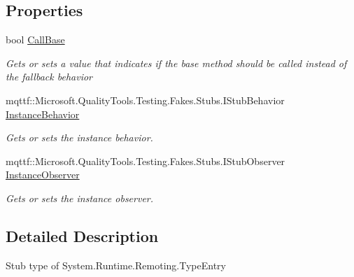 \subsection*{Properties}
\begin{DoxyCompactItemize}
\item 
bool \hyperlink{class_system_1_1_runtime_1_1_remoting_1_1_fakes_1_1_stub_type_entry_a349a3e9e214a63f0b3a0bbc73bd42094}{Call\-Base}
\begin{DoxyCompactList}\small\item\em Gets or sets a value that indicates if the base method should be called instead of the fallback behavior\end{DoxyCompactList}\item 
mqttf\-::\-Microsoft.\-Quality\-Tools.\-Testing.\-Fakes.\-Stubs.\-I\-Stub\-Behavior \hyperlink{class_system_1_1_runtime_1_1_remoting_1_1_fakes_1_1_stub_type_entry_a08508c68e40a04b762b6c6eb4337fd07}{Instance\-Behavior}
\begin{DoxyCompactList}\small\item\em Gets or sets the instance behavior.\end{DoxyCompactList}\item 
mqttf\-::\-Microsoft.\-Quality\-Tools.\-Testing.\-Fakes.\-Stubs.\-I\-Stub\-Observer \hyperlink{class_system_1_1_runtime_1_1_remoting_1_1_fakes_1_1_stub_type_entry_a255f7ddb7a89d310c9b396fe83ca8c41}{Instance\-Observer}
\begin{DoxyCompactList}\small\item\em Gets or sets the instance observer.\end{DoxyCompactList}\end{DoxyCompactItemize}


\subsection{Detailed Description}
Stub type of System.\-Runtime.\-Remoting.\-Type\-Entry



